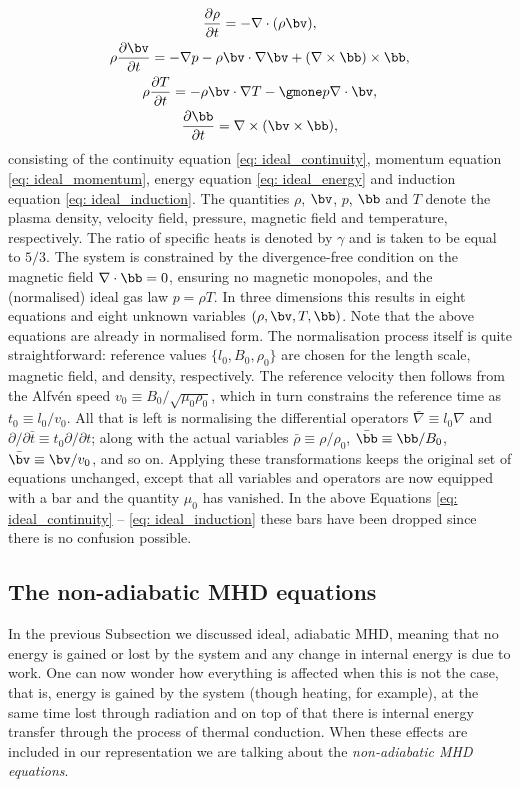 \begin{gather}
  \frac{\partial \rho}{\partial t} = -\nabla \cdot (\rho \bv), \label{eq: ideal_continuity} \\
  \rho \frac{\partial \bv}{\partial t} =
    -\nabla p
    - \rho \bv \cdot \nabla \bv
    + (\nabla \times \bb) \times \bb, \label{eq: ideal_momentum}\\
  \rho \frac{\partial T}{\partial t} =
    -\rho \bv \cdot \nabla T
    -\gmone p \nabla \cdot \bv, \label{eq: ideal_energy} \\
  \frac{\partial \bb}{\partial t} = \nabla \times (\bv \times \bb), \label{eq: ideal_induction}
\end{gather}
consisting of the continuity equation \eqref{eq: ideal_continuity}, momentum equation \eqref{eq: ideal_momentum}, energy equation \eqref{eq: ideal_energy} and induction equation \eqref{eq: ideal_induction}. The quantities $\rho$, $\bv$, $p$, $\bb$ and $T$ denote the plasma density, velocity field, pressure, magnetic field and temperature, respectively. The ratio of specific heats is denoted by $\gamma$ and is taken to be equal to $5/3$. The system is constrained by the divergence-free condition on the magnetic field $\nabla \cdot \bb = 0$, ensuring no magnetic monopoles, and the (normalised) ideal gas law $p = \rho T$. In three dimensions this results in eight equations and eight unknown variables $(\rho, \bv, T, \bb)$. Note that the above equations are already in normalised form. The normalisation process itself is quite straightforward: reference values $\{l_0, B_0, \rho_0\}$ are chosen for the length scale, magnetic field, and density, respectively. The reference velocity then follows from the Alfv\'en speed $v_0 \equiv B_0 / \sqrt{\mu_0 \rho_0}$, which in turn constrains the reference time as $t_0 \equiv l_0 / v_0$. All that is left is normalising the differential operators $\bar{\nabla} \equiv l_0 \nabla$ and $\partial/\partial \bar{t} \equiv t_0 \partial / \partial t$; along with the actual variables $\bar{\rho} \equiv \rho / \rho_0$, $\bar{\bb} \equiv \bb / B_0$, $\bar{\bv} \equiv \bv / v_0$, and so on. Applying these transformations keeps the original set of equations unchanged, except that all variables and operators are now equipped with a bar and the quantity $\mu_0$ has vanished. In the above Equations \eqref{eq: ideal_continuity} -- \eqref{eq: ideal_induction} these bars have been dropped since there is no confusion possible.

\subsection{The non-adiabatic MHD equations}
In the previous Subsection we discussed ideal, adiabatic MHD, meaning that no energy is gained or lost by the system and any change in internal energy is due to work. One can now wonder how everything is affected when this is not the case, that is, energy is gained by the system (though heating, for example), at the same time lost through radiation and on top of that there is internal energy transfer through the process of thermal conduction. When these effects are included in our representation we are talking about the \emph{non-adiabatic MHD equations}.

